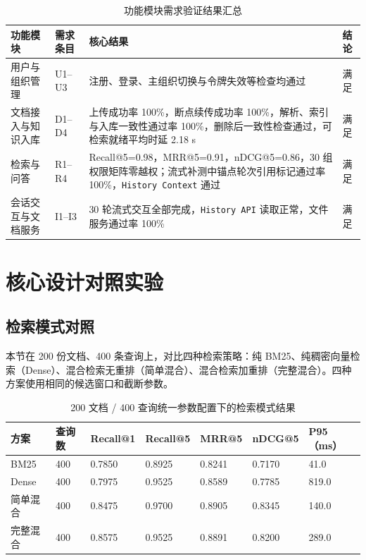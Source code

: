 \FloatBarrier
\begin{table}[H]
    \centering
    \caption{功能模块需求验证结果汇总}
    \label{tab:function-requirement-result}
    {\small
    \begin{tabularx}{\textwidth}{L{2.9cm}L{1.7cm}Y L{1.8cm}}
        \toprule
        功能模块 & 需求条目 & 核心结果 & 结论 \\
        \midrule
        用户与组织管理 & U1--U3 & 注册、登录、主组织切换与令牌失效等检查均通过 & 满足 \\
        文档接入与知识入库 & D1--D4 & 上传成功率 100\%，断点续传成功率 100\%，解析、索引与入库一致性通过率 100\%，删除后一致性检查通过，可检索就绪平均时延 2.18 s & 满足 \\
        检索与问答 & R1--R4 & Recall@5=0.98，MRR@5=0.91，nDCG@5=0.86，30 组权限矩阵零越权；流式补测中锚点轮次引用标记通过率 100\%，\texttt{History Context} 通过 & 满足 \\
        会话交互与文档服务 & I1--I3 & 30 轮流式交互全部完成，\texttt{History API} 读取正常，文件服务通过率 100\% & 满足 \\
        \bottomrule
    \end{tabularx}
    }
\end{table}

\section{核心设计对照实验}

\subsection{检索模式对照}

本节在 200 份文档、400 条查询上，对比四种检索策略：纯 BM25、纯稠密向量检索（Dense）、混合检索无重排（简单混合）、混合检索加重排（完整混合）。四种方案使用相同的候选窗口和截断参数。



\begin{table}[H]
    \centering
    \caption{200 文档 / 400 查询统一参数配置下的检索模式结果}
    \label{tab:retrieval-ablation-result}
    {\small
    \begin{tabularx}{\textwidth}{L{2.2cm}L{1.2cm}L{1.5cm}L{1.5cm}L{1.5cm}L{1.5cm}Y}
        \toprule
        方案 & 查询数 & Recall@1 & Recall@5 & MRR@5 & nDCG@5 & P95（ms） \\
        \midrule
        BM25 & 400 & 0.7850 & 0.8925 & 0.8241 & 0.7170 & 41.0 \\
        Dense & 400 & 0.7975 & 0.9525 & 0.8589 & 0.7785 & 819.0 \\
        简单混合 & 400 & 0.8475 & 0.9700 & 0.8905 & 0.8345 & 140.0 \\
        完整混合 & 400 & 0.8575 & 0.9525 & 0.8891 & 0.8200 & 289.0 \\
        \bottomrule
    \end{tabularx}
    }
\end{table}

